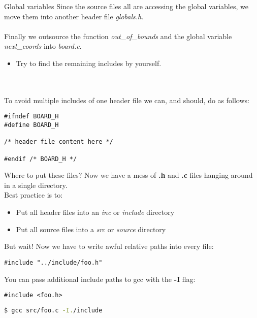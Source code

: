 
\begin{frame}[fragile]{Global variables}
	Since the source files all are accessing the global variables, we move them into another header file \textit{globals.h}.\\\ \\
	Finally we outsource the function \textit{out\_of\_bounds} and the global variable \textit{next\_coords} into \textit{board.c}.\\
	\begin{itemize}
		\item Try to find the remaining includes by yourself.
	\end{itemize}\ \\\ \\
	To avoid multiple includes of one header file we can, and should, do as follows:
	\begin{lstlisting}
#ifndef BOARD_H
#define BOARD_H

/* header file content here */

#endif /* BOARD_H */
\end{lstlisting}
\end{frame}


\begin{frame}[fragile]{Where to put these files?}
    Now we have a mess of \textbf{.h} and \textbf{.c} files hanging around in a single directory.\\
    Best practice is to:
    \begin{itemize}
        \item Put all header files into an \textit{inc} or \textit{include} directory
        \item Put all source files into a \textit{src} or \textit{source} directory
    \end{itemize}
    \pause
    \bigskip
    But wait! Now we have to write awful relative paths into every file:
    \begin{lstlisting}
#include "../include/foo.h"
    \end{lstlisting}
    \pause
    \bigskip
    You can pass additional include paths to gcc with the \textbf{-I} flag:
    \begin{lstlisting}
#include <foo.h>
    \end{lstlisting}
    \begin{lstlisting}[language=bash]
$ gcc src/foo.c -I./include
    \end{lstlisting}
\end{frame}

